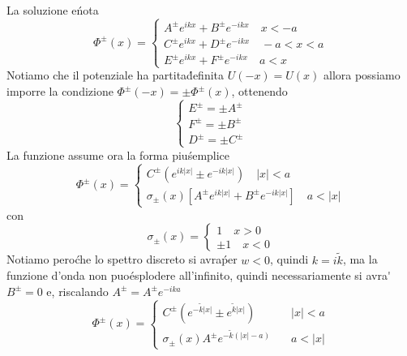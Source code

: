 \documentclass[a4paper]{article}
\begin{document}
        La soluzione e\' nota
        \begin{equation*}
            \Phi^\pm(x)=
            \begin{cases}
                A^\pm e^{ikx}+B^\pm e^{-ikx}\quad x<-a\\
                C^\pm e^{ikx}+D^\pm e^{-ikx}\quad -a<x<a\\
                E^\pm e^{ikx}+F^\pm e^{-ikx}\quad a<x
            \end{cases}
        \end{equation*}
        Notiamo che il potenziale ha partita\' definita $U(-x)=U(x)$ allora possiamo imporre la condizione $\Phi^\pm(-x)=\pm\Phi^\pm(x)$, ottenendo
        \begin{equation*}
            \begin{cases}
                E^\pm=\pm A^\pm\\
                F^\pm=\pm B^\pm\\
                D^\pm=\pm C^\pm
            \end{cases}
        \end{equation*}
        La funzione assume ora la forma piu\' semplice
        \begin{equation*}
            \Phi^\pm(x)=
            \begin{cases}
                C^\pm \left(e^{ik\left\lvert x\right\rvert }\pm e^{-ik\left\lvert x\right\rvert }\right)\quad \left\lvert x\right\rvert<a\\
                \sigma_\pm(x)\left[A^\pm e^{ik\left\lvert x\right\rvert }+B^\pm e^{-ik\left\lvert x\right\rvert }\right]\quad a<\left\lvert x\right\rvert
            \end{cases}
        \end{equation*}
        con
        \begin{equation*}
            \sigma_\pm(x)=
            \begin{cases}
                1\quad x>0\\
                \pm 1\quad x<0
            \end{cases}
        \end{equation*}
        Notiamo pero\' che lo spettro discreto si avra\' per $w<0$, quindi $k=i\tilde{k}$, ma la funzione d'onda non puo\' esplodere all'infinito, quindi necessariamente si avra\' $B^\pm=0$ e, riscalando $A^\pm=A^\pm e^{-ika}$
        \begin{equation*}
            \Phi^\pm(x)=
            \begin{cases}
                C^\pm \left(e^{-\tilde{k}\left\lvert x\right\rvert }\pm e^{\tilde{k}\left\lvert x\right\rvert }\right)\quad &\left\lvert x\right\rvert<a\\
                \sigma_\pm(x)A^\pm e^{-\tilde{k}(\left\lvert x\right\rvert-a)}\quad &a<\left\lvert x\right\rvert
            \end{cases}
        \end{equation*}
\end{document}
